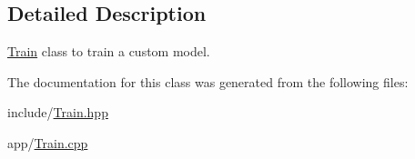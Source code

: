 \subsection{Detailed Description}
\hyperlink{classTrain}{Train} class to train a custom model. 

The documentation for this class was generated from the following files\+:\begin{DoxyCompactItemize}
\item 
include/\hyperlink{Train_8hpp}{Train.\+hpp}\item 
app/\hyperlink{Train_8cpp}{Train.\+cpp}\end{DoxyCompactItemize}
